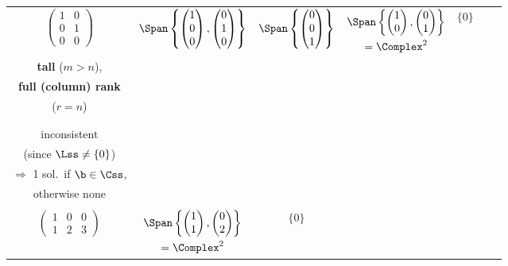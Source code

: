 \begin{sidewaystable}
{{\begin{tabular}{c|c|c|c|c|c|c}
$\begin{pmatrix} 1 & 0 \\ 0 & 1 \\ 0 & 0 \end{pmatrix}$ &
$\Span\left\{ \begin{pmatrix} 1 \\ 0 \\ 0 \end{pmatrix}, \begin{pmatrix} 0 \\ 1 \\ 0 \end{pmatrix} \right\}$ 
& $\Span\left\{ \begin{pmatrix} 0 \\ 0 \\ 1 \end{pmatrix} \right\}$ &
$\begin{gathered} \Span\left\{ \begin{pmatrix} 1 \\ 0 \end{pmatrix}, \begin{pmatrix} 0 \\ 1 \end{pmatrix} \right\} \\ = \Complex^{2} \end{gathered}$ &
$\{0\}$ &
\begin{parbox}{1.1in}{~\\{\bf  tall} ($m>n$),\\
{\bf full (column) rank} \\
($r=n$)\\[-0.08in]}\end{parbox} &
\begin{parbox}{0.9in}{~\\  {\bf potentially \\ inconsistent} \\ {\small (since $\Lss \ne \{0\}$)} \\
\small $\Rightarrow$ 1 sol.~if $\b\in \Css$, \\ otherwise none\\[-0.08in]}\end{parbox} \\ \hline
$\begin{pmatrix} 1 & 0 & 0 \\ 1 & 2 & 3 \end{pmatrix}$ &
$\begin{gathered} \Span\left\{ \begin{pmatrix} 1 \\ 1 \end{pmatrix}, \begin{pmatrix} 0 \\ 2 \end{pmatrix} \right\} \\ = \Complex^{2} \end{gathered}$ & $\{0\}$ &

\end{tabular}}}
\end{sidewaystable}
